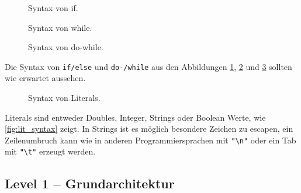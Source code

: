     \begin{figure}[H]
      \centering
      
      \caption{Syntax von if.}
      \label{fig:if_syntax}
    \end{figure}

    \begin{figure}[H]
      \centering
      
      \caption{Syntax von while.}
      \label{fig:while_syntax}
    \end{figure}

    \begin{figure}[H]
      \centering
      
      \caption{Syntax von do-while.}
      \label{fig:do_while_syntax}
    \end{figure}
    Die Syntax von \lstinline[style=MyMacroStyle]$if/else$ und \lstinline[style=MyMacroStyle]$do-/while$ aus den Abbildungen \ref{fig:if_syntax}, \ref{fig:while_syntax} und \ref{fig:do_while_syntax} sollten wie erwartet aussehen.

    \begin{figure}[H]
      \centering
      
      \caption{Syntax von Literals.}
      \label{fig:lit_syntax}
    \end{figure}
    Literals sind entweder Doubles, Integer, Strings oder Boolean Werte, wie \autoref{fig:lit_syntax} zeigt. In Strings ist es möglich besondere Zeichen zu escapen, ein Zeilenumbruch kann wie in anderen Programmiersprachen mit \lstinline[style=MyMacroStyle]$"\n"$ oder ein Tab mit \lstinline[style=MyMacroStyle]$"\t"$  erzeugt werden.


  \subsection{Level 1 -- Grundarchitektur}
  \label{ssec:Level 1 -- Grundarchitektur}
    \begin{figure}[H]
      \centering
      
      \label{fig:abstract_goal_uml}
    \end{figure}

